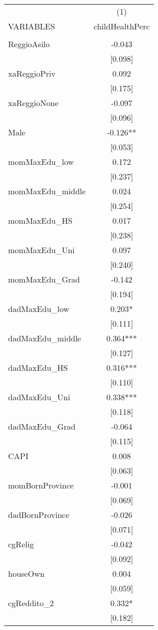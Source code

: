 \documentclass[]{article}
\begin{document}
\begin{tabular}{lc} \hline
 & (1) \\
VARIABLES & childHealthPerc \\ \hline
 &  \\
ReggioAsilo & -0.043 \\
 & [0.098] \\
xaReggioPriv & 0.092 \\
 & [0.175] \\
xaReggioNone & -0.097 \\
 & [0.096] \\
Male & -0.126** \\
 & [0.053] \\
momMaxEdu\_low & 0.172 \\
 & [0.237] \\
momMaxEdu\_middle & 0.024 \\
 & [0.254] \\
momMaxEdu\_HS & 0.017 \\
 & [0.238] \\
momMaxEdu\_Uni & 0.097 \\
 & [0.240] \\
momMaxEdu\_Grad & -0.142 \\
 & [0.194] \\
dadMaxEdu\_low & 0.203* \\
 & [0.111] \\
dadMaxEdu\_middle & 0.364*** \\
 & [0.127] \\
dadMaxEdu\_HS & 0.316*** \\
 & [0.110] \\
dadMaxEdu\_Uni & 0.338*** \\
 & [0.118] \\
dadMaxEdu\_Grad & -0.064 \\
 & [0.115] \\
CAPI & 0.008 \\
 & [0.063] \\
momBornProvince & -0.001 \\
 & [0.069] \\
dadBornProvince & -0.026 \\
 & [0.071] \\
cgRelig & -0.042 \\
 & [0.092] \\
houseOwn & 0.004 \\
 & [0.059] \\
cgReddito\_2 & 0.332* \\
 & [0.182] \\

\end{tabular}
\end{document}
